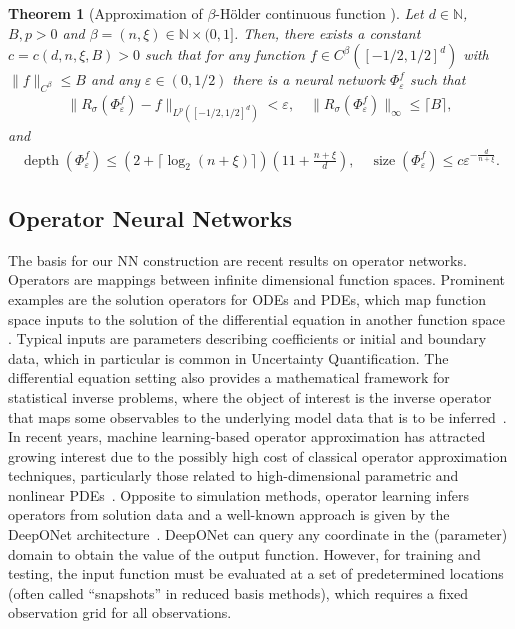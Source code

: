 \documentclass[12pt]{article}
\newtheorem{theorem}{Theorem}[section]
\theoremstyle{remark}
\theoremstyle{plain}
\numberwithin{equation}{section}
\newcommand{\N}{\mathbb{N}}
\DeclareMathOperator{\Size}{size}
\DeclareMathOperator{\Depth}{depth}
\begin{document}
\begin{theorem}[{Approximation of $\beta$-H\"older continuous function \cite[Theorem~3.1]{Petersen2018}}]\label{theorem:approx_holder_nn}
    Let $d \in \N$, $B,p > 0$ and $\beta=(n,\xi) \in \N \times (0,1]$.
    Then, there exists a constant $c = c(d,n,\xi,B) > 0$ such that for any function $f \in C^\beta([-1/2,1/2]^d)$ with $\|f\|_{C^\beta} \leq B$ and any $\varepsilon \in (0,1/2)$ there is a neural network $\Phi_\varepsilon^f$ such that
    \begin{align*}
        \|R_\sigma(\Phi_\varepsilon^f) - f\|_{L^p([-1/2,1/2]^d)} < \varepsilon,\quad
        \|R_\sigma(\Phi_\varepsilon^f)\|_\infty \leq \lceil B \rceil,
    \end{align*}
    and
    \begin{align*}
        \Depth(\Phi_\varepsilon^f) \leq (2 + \lceil \log_2(n + \xi)\rceil)\left(11+\frac{n+\xi}{d}\right),\quad
        \Size(\Phi_\varepsilon^f) \leq c\varepsilon^{-\frac{d}{n+\xi}}.
    \end{align*}
\end{theorem}




\subsection{Operator Neural Networks}
\label{sec:operator networks}

The basis for our NN construction are recent results on operator networks.
Operators are mappings between infinite dimensional function spaces.
Prominent examples are the solution operators for ODEs and PDEs, which map function space inputs to the solution of the differential equation in another function space \cite{tianpingchenUniversalApproximationNonlinear1995,luDeepONetLearningNonlinear2021,li2021fourier,kovachki2023neural}.
Typical inputs are parameters describing coefficients or initial and boundary data, which in particular is common in Uncertainty Quantification.
The differential equation setting also provides a mathematical framework for statistical inverse problems, where the object of interest is the inverse operator that maps some observables to the underlying model data that is to be inferred~\cite{stuart2010inverse,gao2023adaptive}.
In recent years, machine learning-based operator approximation has attracted growing interest due to the possibly high cost of classical operator approximation techniques, particularly those related to high-dimensional parametric and nonlinear PDEs~\cite{Marcati2023,Deng2022}.
Opposite to simulation methods, operator learning infers operators from solution data and a well-known approach is given by the DeepONet architecture~\cite{luDeepONetLearningNonlinear2021}.
DeepONet can query any coordinate in the (parameter) domain to obtain the value of the output function.
However, for training and testing, the input function must be evaluated at a set of predetermined locations (often called ``snapshots'' in reduced basis methods), which requires a fixed observation grid for all observations.
\end{document}

